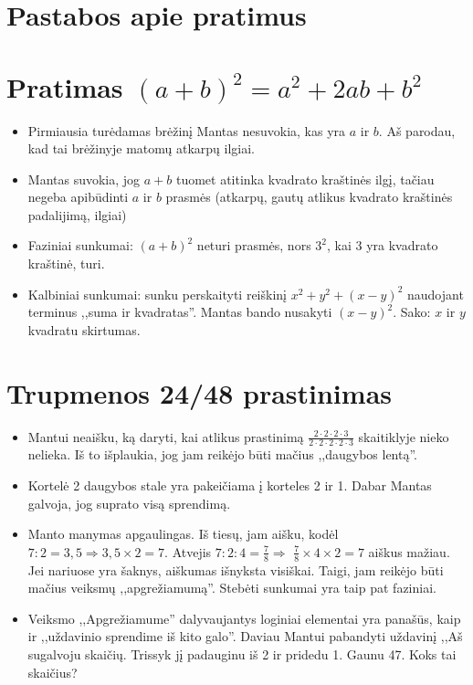 \documentclass[a4paper,png]{article}
\begin{document}
\section*{Pastabos apie pratimus}
\section{Pratimas $(a+b)^2=a^2+2ab+b^2$}
\begin{itemize} 
\item Pirmiausia turėdamas brėžinį Mantas nesuvokia, kas yra $a$ ir $b$. Aš parodau, kad tai brėžinyje matomų atkarpų ilgiai.
\item Mantas suvokia, jog $a+b$ tuomet atitinka kvadrato kraštinės ilgį, tačiau negeba apibūdinti $a$ ir $b$ prasmės (atkarpų, gautų atlikus kvadrato kraštinės padalijimą, ilgiai)
\item Faziniai sunkumai: $(a+b)^2$ neturi prasmės, nors $3^2$, kai 3 yra kvadrato kraštinė, turi.
\item Kalbiniai sunkumai: sunku perskaityti reiškinį $x^2+y^2+(x-y)^2$ naudojant terminus ,,suma ir kvadratas''. Mantas bando nusakyti $(x-y)^2$. Sako: $x$ ir $y$ kvadratu skirtumas.
\end{itemize}
\section{Trupmenos 24/48 prastinimas}
\begin{itemize} 
\item Mantui neaišku, ką daryti, kai atlikus prastinimą $\frac{2\cdot 2\cdot 2\cdot 3}{2 \cdot 2\cdot 2\cdot 2\cdot 3}$ skaitiklyje nieko nelieka. Iš to išplaukia, jog jam reikėjo būti mačius ,,daugybos lentą''.
\item Kortelė 2 daugybos stale yra pakeičiama į korteles 2 ir 1. Dabar Mantas galvoja, jog suprato visą sprendimą.
\item Manto manymas apgaulingas. Iš tiesų, jam aišku, kodėl $\boxed{7:2=3,5} \Rightarrow\boxed{3,5 \times 2=7}$. Atvejis $\boxed{7:2:4=\frac{7}{8}} \Rightarrow$ $\boxed{\frac{7}{8} \times 4 \times 2=7}$ aiškus mažiau. Jei nariuose yra šaknys, aiškumas išnyksta visiškai. Taigi, jam reikėjo būti mačius veiksmų ,,apgrežiamumą''. Stebėti sunkumai yra taip pat faziniai.
\item Veiksmo ,,Apgrežiamume''  dalyvaujantys loginiai elementai yra panašūs, kaip ir ,,uždavinio sprendime iš kito galo''. Daviau Mantui pabandyti uždavinį ,,Aš sugalvoju skaičių. Trissyk jį padauginu iš 2 ir pridedu 1. Gaunu 47. Koks tai skaičius?
\end{itemize}
\end{document}
